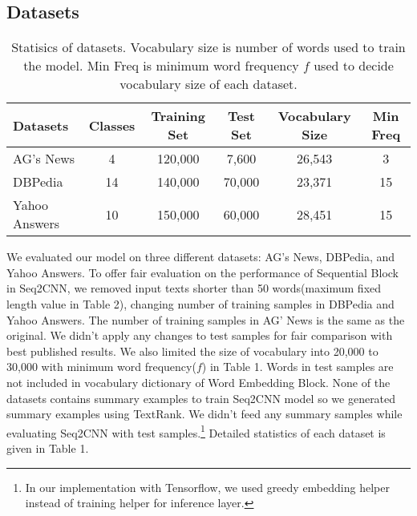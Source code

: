 \documentclass{article}
\begin{document}
\subsection{Datasets}
\begin{table}[!ht]
  \caption{Statisics of datasets. Vocabulary size is number of words used to train the model. Min Freq is minimum word frequency $f$ used to decide vocabulary size of each dataset.}
  \label{table1}
  \centering
  \begin{tabular}{lccccc}
    \toprule
    Datasets & Classes& Training Set&Test Set & Vocabulary Size& Min Freq\\
    \midrule
   AG's News &4  &120,000 &7,600  &26,543 &3  \\
    DBPedia  &14 &140,000 &70,000 &23,371 &15 \\
    Yahoo Answers &10 &150,000 & 60,000  &28,451 &15  \\
    \bottomrule
  \end{tabular}
\end{table}
We evaluated our model on three different datasets: AG's News, DBPedia, and Yahoo Answers\cite{DBLP:journals/corr/ZhangZL15}. To offer fair evaluation on the performance of Sequential Block in Seq2CNN, we removed input texts shorter than 50 words(maximum fixed length value in Table 2), changing number of training samples in DBPedia and Yahoo Answers. The number of training samples in AG' News is the same as the original. We didn't apply any changes to test samples for fair comparison with best published results. We also limited the size of vocabulary into 20,000 to 30,000 with minimum word frequency($f$) in Table 1. Words in test samples are not included in vocabulary dictionary of Word Embedding Block. None of the datasets contains summary examples to train Seq2CNN model so we generated summary examples using TextRank\cite{mihalcea-tarau:2004:EMNLP}. We didn't feed any summary samples while evaluating Seq2CNN with test samples.\footnote{In our implementation with Tensorflow, we used greedy embedding helper instead of training helper for inference layer.}  Detailed statistics of each dataset is given in Table 1. 
\end{document}
